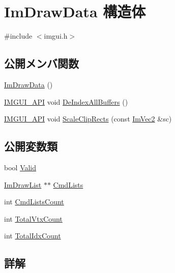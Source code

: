 \hypertarget{struct_im_draw_data}{}\section{Im\+Draw\+Data 構造体}
\label{struct_im_draw_data}


{\ttfamily \#include $<$imgui.\+h$>$}

\subsection*{公開メンバ関数}
\begin{DoxyCompactItemize}
\item 
\mbox{\hyperlink{struct_im_draw_data_a96b50c40107c997e9eea7ac3ba1a6138}{Im\+Draw\+Data}} ()
\item 
\mbox{\hyperlink{imgui_8h_a43829975e84e45d1149597467a14bbf5}{I\+M\+G\+U\+I\+\_\+\+A\+PI}} void \mbox{\hyperlink{struct_im_draw_data_a88ae746e958b79ee527fe94dee29d57c}{De\+Index\+All\+Buffers}} ()
\item 
\mbox{\hyperlink{imgui_8h_a43829975e84e45d1149597467a14bbf5}{I\+M\+G\+U\+I\+\_\+\+A\+PI}} void \mbox{\hyperlink{struct_im_draw_data_abbfb7f8351b436da654f93b6f103f0e2}{Scale\+Clip\+Rects}} (const \mbox{\hyperlink{struct_im_vec2}{Im\+Vec2}} \&sc)
\end{DoxyCompactItemize}
\subsection*{公開変数類}
\begin{DoxyCompactItemize}
\item 
bool \mbox{\hyperlink{struct_im_draw_data_ad01ab9ce5e8843b7860ccbb3eb9a6554}{Valid}}
\item 
\mbox{\hyperlink{struct_im_draw_list}{Im\+Draw\+List}} $\ast$$\ast$ \mbox{\hyperlink{struct_im_draw_data_a9e93fe7e620eb2e9f61e3b689d617edc}{Cmd\+Lists}}
\item 
int \mbox{\hyperlink{struct_im_draw_data_adc0bbc2881c15f78bdabe51d82582f4e}{Cmd\+Lists\+Count}}
\item 
int \mbox{\hyperlink{struct_im_draw_data_af0035b52cdf91932b25eaf2da853965a}{Total\+Vtx\+Count}}
\item 
int \mbox{\hyperlink{struct_im_draw_data_a1ac8a5d441f464628295ef91a0602fc5}{Total\+Idx\+Count}}
\end{DoxyCompactItemize}


\subsection{詳解}


